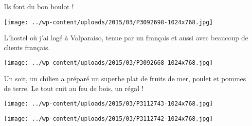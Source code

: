 Ils font du bon boulot !
\begin{center} \texttt{[image: ../wp-content/uploads/2015/03/P3092698-1024x768.jpg]} \end{center}

\pagebreak
 L'hostel où j'ai logé à Valparaiso, tenue par un français et aussi avec beaucoup de clients français.
\begin{center} \texttt{[image: ../wp-content/uploads/2015/03/P3092668-1024x768.jpg]} \end{center}

 Un soir, un chilien a préparé un superbe plat de fruits de mer, poulet et pommes de terre. Le tout cuit au feu de bois, un régal !
\begin{center} \texttt{[image: ../wp-content/uploads/2015/03/P3112743-1024x768.jpg]} \end{center}
\begin{center} \texttt{[image: ../wp-content/uploads/2015/03/P3112742-1024x768.jpg]} \end{center}

